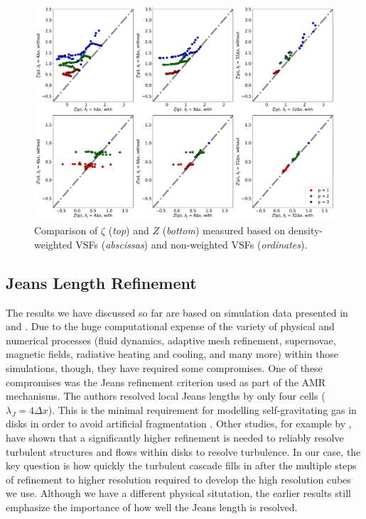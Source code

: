 \begin{figure}
	\centering
    \includegraphics[width=\textwidth]{comp_weighting.pdf}
    \caption{ Comparison of $\zeta$ (\textit{top}) and $Z$ (\textit{bottom}) measured based on density-weighted VSFs (\textit{abscissas}) and non-weighted VSFs (\textit{ordinates}). }
    \label{pic:results:comp_weighting}
\end{figure}




\subsection{Jeans Length Refinement}\label{results:refinement}

The results we have discussed so far are based on simulation data 
presented in  and .
Due to the huge computational expense of the variety of physical and numerical processes (fluid dynamics, adaptive mesh refinement, supernovae, magnetic fields, radiative heating and cooling, and many more) within those simulations, though, they have required some compromises.
One of these compromises was the Jeans refinement criterion used as part of the AMR mechanisms.
The authors resolved local Jeans lengths by only four cells ($\lambda_J=4\Delta{}x$).
This is the minimal requirement for modelling self-gravitating gas in 
    disks in
order to avoid artificial fragmentation \citep{Truelove1998}. 
Other studies, for example by \citet{Turk2012}, have shown that a significantly higher refinement is needed to reliably resolve turbulent structures and flows
    within disks to resolve turbulence.  In our case, the key question is how quickly 
    the turbulent cascade fills in after the multiple steps of refinement to higher resolution 
    required to develop the high resolution cubes we use.  Although we have a 
    different physical situtation, the earlier results still emphasize the importance of 
    how well the Jeans length is resolved.


